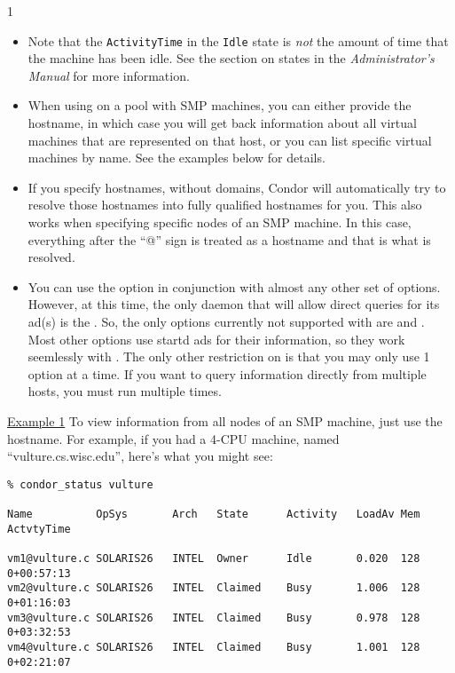 \begin{ManPage}{\label{man-condor-status}}{1}
\begin{itemize}
	\item Note that the \texttt{ActivityTime} in the \texttt{Idle} state is
	\emph{not} the amount of time that the machine has been idle.  See the
	section on  states in the \emph{Administrator's Manual}
	for more information.

	\item When using  on a pool with SMP machines,
	you can either provide the hostname, in which case you will
	get back information about all virtual machines that are
	represented on that host, or you can list specific virtual
	machines by name.  
	See the examples below for details.

	\item If you specify hostnames, without domains, Condor will
	automatically try to resolve those hostnames into fully
	qualified hostnames for you.
	This also works when specifying specific nodes of an SMP
	machine.
	In this case, everything after the ``@'' sign is treated as a
	hostname and that is what is resolved.

	\item You can use the  option in conjunction with
	almost any other set of options.
	However, at this time, the only daemon that will allow direct
	queries for its ad(s) is the .
	So, the only options currently not supported with
	 are  and .
	Most other options use startd ads for their information, so
	they work seemlessly with .
	The only other restriction on  is that you may
	only use 1  option at a time.
	If you want to query information directly from multiple hosts,
	you must run  multiple times.

\end{itemize}

\Examples

\underline{Example 1} To view information from all nodes of an SMP
machine, just use the hostname.
For example, if you had a 4-CPU machine, named
``vulture.cs.wisc.edu'', here's what you might see:
\begin{verbatim}
% condor_status vulture

Name          OpSys       Arch   State      Activity   LoadAv Mem   ActvtyTime

vm1@vulture.c SOLARIS26   INTEL  Owner      Idle       0.020  128   0+00:57:13
vm2@vulture.c SOLARIS26   INTEL  Claimed    Busy       1.006  128   0+01:16:03
vm3@vulture.c SOLARIS26   INTEL  Claimed    Busy       0.978  128   0+03:32:53
vm4@vulture.c SOLARIS26   INTEL  Claimed    Busy       1.001  128   0+02:21:07


\end{verbatim}
\end{ManPage}
